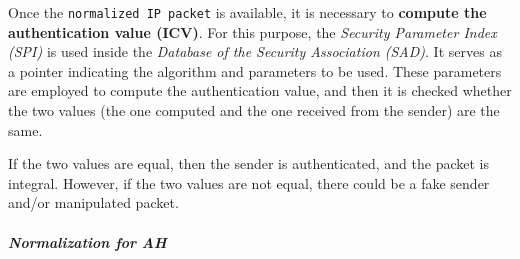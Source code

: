 Once the \texttt{normalized IP packet} is available, it is necessary to \textbf{compute the authentication value (ICV)}. For this purpose, the \textit{Security Parameter Index (SPI)} is used inside the \textit{Database of the Security Association (SAD)}. It serves as a pointer indicating the algorithm and parameters to be used. These parameters are employed to compute the authentication value, and then it is checked whether the two values (the one computed and the one received from the sender) are the same.

If the two values are equal, then the sender is authenticated, and the packet is integral. However, if the two values are not equal, there could be a fake sender and/or manipulated packet.



\subparagraph{Normalization for AH}
